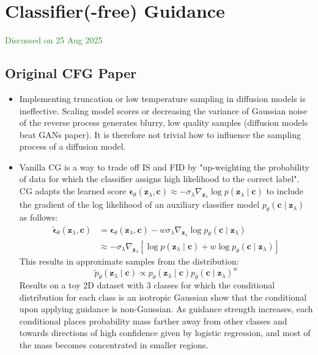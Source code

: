 \documentclass{article}
\begin{document}
\section{Classifier(-free) Guidance}
\textcolor{ForestGreen}{Discussed on 25 Aug 2025} 
\subsection{\color{ForestGreen} Original CFG Paper}
 
\begin{itemize}
\item Implementing truncation or low temperature sampling in diffusion models is ineffective. Scaling model scores or decreasing the variance of Gaussian noise of the reverse process generates blurry, low quality samples (diffusion models beat GANs paper). It is therefore not trivial how to influence the sampling process of a diffusion model.
\item Vanilla CG is a way to trade off IS and FID by "up-weighting the probability of data for which the classifier assigns high likelihood to the correct label". CG adapts the learned score $\boldsymbol{\epsilon}_\theta\left(\mathbf{z}_\lambda, \mathbf{c}\right) \approx-\sigma_\lambda \nabla_{\mathbf{z}_\lambda} \log p\left(\mathbf{z}_\lambda \mid \mathbf{c}\right)$ to include the gradient of the log likelihood of an auxiliary classifier model $p_\theta\left(\mathbf{c} \mid \mathbf{z}_\lambda\right)$ as follows:
\begin{align*}
\tilde{\boldsymbol{\epsilon}}_\theta\left(\mathbf{z}_\lambda, \mathbf{c}\right)&=\boldsymbol{\epsilon}_\theta\left(\mathbf{z}_\lambda, \mathbf{c}\right)-w \sigma_\lambda \nabla_{\mathbf{z}_\lambda} \log p_\theta\left(\mathbf{c} \mid \mathbf{z}_\lambda\right)\\ &\approx-\sigma_\lambda \nabla_{\mathbf{z}_\lambda}\left[\log p\left(\mathbf{z}_\lambda \mid \mathbf{c}\right)+w \log p_\theta\left(\mathbf{c} \mid \mathbf{z}_\lambda\right)\right]
\end{align*}
This results in approximate samples from the distribution:
$$
\tilde{p}_\theta\left(\mathbf{z}_\lambda \mid \mathbf{c}\right) \propto p_\theta\left(\mathbf{z}_\lambda \mid \mathbf{c}\right) p_\theta\left(\mathbf{c} \mid \mathbf{z}_\lambda\right)^w
$$
Results on a toy 2D dataset with 3 classes for which the conditional distribution for each class is an isotropic Gaussian show that the conditional upon applying guidance is non-Gaussian. 
As guidance strength increases, each conditional places probability mass farther away from other classes and towards directions of high confidence given by logistic regression, and most of the mass becomes concentrated in smaller regions. 

\end{itemize}
\end{document}
